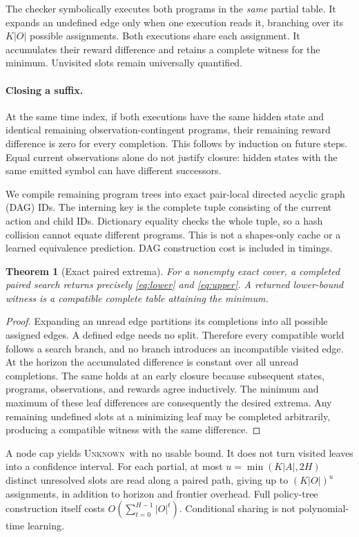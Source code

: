 \documentclass[10pt,twocolumn]{article}
\newtheorem{theorem}{Theorem}
\newcommand{\unk}{\textsc{Unknown}}
\begin{document}
The checker symbolically executes both programs in the \emph{same} partial
table. It expands an undefined edge only when one execution reads it, branching
over its $K|O|$ possible assignments. Both executions share each assignment.
It accumulates their reward difference and retains a complete witness for the
minimum. Unvisited slots remain universally quantified.

\paragraph{Closing a suffix.}
At the same time index, if both executions have the same hidden state and
identical remaining observation-contingent programs, their remaining reward
difference is zero for every completion. This follows by induction on future
steps. Equal current observations alone do not justify closure: hidden states
with the same emitted symbol can have different successors.

We compile remaining program trees into exact pair-local directed acyclic graph
(DAG) IDs. The interning key is the complete tuple consisting of the current
action and child IDs. Dictionary equality checks the whole tuple, so a hash
collision cannot equate different programs. This is not a shapes-only cache or
a learned equivalence prediction. DAG construction cost is included in timings.

\begin{theorem}[Exact paired extrema]\label{thm:checker}
For a nonempty exact cover, a completed paired search returns precisely
\eqref{eq:lower} and \eqref{eq:upper}. A returned lower-bound witness is a
compatible complete table attaining the minimum.
\end{theorem}
\begin{proof}
Expanding an unread edge partitions its completions into all possible assigned
edges. A defined edge needs no split. Therefore every compatible world follows
a search branch, and no branch introduces an incompatible visited edge.
At the horizon the accumulated difference is constant over all unread
completions. The same holds at an early closure because subsequent states,
programs, observations, and rewards agree inductively. The minimum and maximum
of these leaf differences are consequently the desired extrema. Any remaining
undefined slots at a minimizing leaf may be completed arbitrarily, producing a
compatible witness with the same difference.
\end{proof}

A node cap yields \unk\ with no usable bound. It does not turn visited leaves
into a confidence interval. For each partial, at most
$u=\min(K|A|,2H)$ distinct unresolved slots are read along a paired path, giving
up to $(K|O|)^u$ assignments, in addition to horizon and frontier overhead.
Full policy-tree construction itself costs
$O(\sum_{t=0}^{H-1}|O|^t)$. Conditional sharing is not polynomial-time learning.
\end{document}
